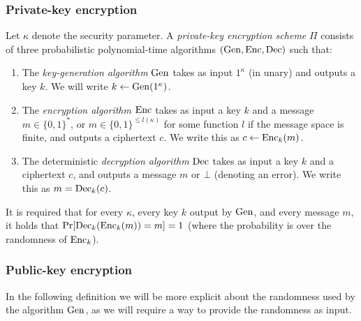 \subsubsection{Private-key encryption}

\begin{definition}
	Let $\kappa$ denote the security parameter. A \emph{private-key encryption scheme} $\Pi$ consists of three probabilistic polynomial-time algorithms $(\mathrm{Gen}, \mathrm{Enc}, \mathrm{Dec})$ such that:
	\begin{enumerate}[1.]
		\item The \emph{key-generation algorithm} $\mathrm{Gen}$ takes as input $1^\kappa$ (in unary) and outputs a key $k$. We will write $k \leftarrow \mathrm{Gen}(1^\kappa)$.
		\item The \emph{encryption algorithm} $\mathrm{Enc}$ takes as input a key $k$ and a message $m \in \{0, 1\}^*$, or $m \in \{0, 1\}^{\le l(\kappa)}$ for some function $l$ if the message space is finite, and outputs a ciphertext $c$. We write this as $c \leftarrow \mathrm{Enc}_k(m)$.
		\item The deterministic \emph{decryption algorithm} $\mathrm{Dec}$ takes as input a key $k$ and a ciphertext $c$, and outputs a message $m$ or $\bot$ (denoting an error). We write this as $m = \mathrm{Dec}_{k}(c)$.
	\end{enumerate}

	It is required that for every $\kappa$, every key $k$ output by $\mathrm{Gen}$, and every message $m$, it holds that $\pr{\dec_k(\enc_k(m)) = m} = 1$ (where the probability is over the randomness of $\mathrm{Enc}_k$).
\end{definition}

\subsubsection{Public-key encryption}

In the following definition we will be more explicit about the randomness used by the algorithm $\mathrm{Gen}$, as we will require a way to provide the randomness as input.

